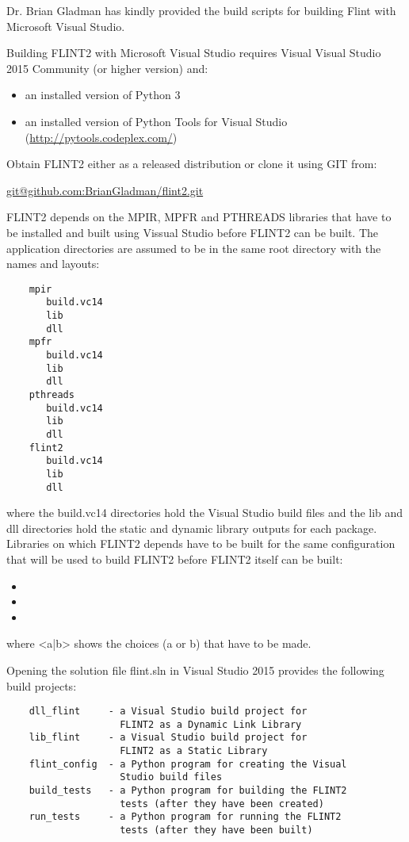 \documentclass[a4paper,10pt]{book}
\begin{document}
Dr. Brian Gladman has kindly provided the build scripts for building
Flint with Microsoft Visual Studio.

Building FLINT2 with Microsoft Visual Studio requires Visual
Visual Studio 2015 Community (or higher version) and:
\begin{itemize}
\item an installed version of Python 3
\item an installed version of Python Tools 
         for Visual Studio (\url{http://pytools.codeplex.com/})
\end{itemize}

Obtain FLINT2 either as a released distribution or clone it using
GIT from:

\indent \url{git@github.com:BrianGladman/flint2.git}

FLINT2 depends on the MPIR, MPFR and PTHREADS libraries that have
to be installed and built using Vissual Studio before FLINT2 can
be built.  The application directories are assumed to be in the
same root directory with the names and layouts:
   
\begin{verbatim}
    mpir
       build.vc14
       lib
       dll
    mpfr  
       build.vc14
       lib
       dll
    pthreads  
       build.vc14
       lib
       dll
    flint2
       build.vc14
       lib
       dll
\end{verbatim}
   
where the build.vc14 directories hold the Visual Studio build
files and the lib and dll directories hold the static and dynamic
library outputs for each package.  Libraries on which FLINT2
depends have to be built for the same configuration that will be 
used to build FLINT2 before FLINT2 itself can be built:
\begin{itemize}
\item <Static Library|Dynamic Link Library>
\item <Win32|x64>
\item <Release|Debug>
\end{itemize}
where <a|b> shows the choices (a or b) that have to be made.   

Opening the solution file flint.sln in Visual Studio 2015 provides
the following build projects:

\begin{verbatim}
    dll_flint     - a Visual Studio build project for
                    FLINT2 as a Dynamic Link Library
    lib_flint     - a Visual Studio build project for
                    FLINT2 as a Static Library
    flint_config  - a Python program for creating the Visual 
                    Studio build files
    build_tests   - a Python program for building the FLINT2
                    tests (after they have been created)
    run_tests     - a Python program for running the FLINT2
                    tests (after they have been built)
\end{verbatim}
\end{document}
